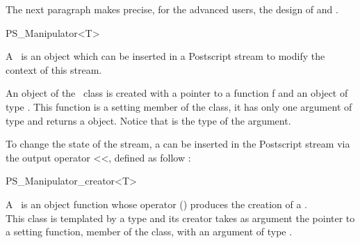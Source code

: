 \begin{ccAdvanced}

The next paragraph makes precise, for the advanced users, the design of
 and .


\begin{ccClassTemplate}{PS_Manipulator<T>}

A \ccClassTemplateName\ is an object which can be inserted in a
Postscript stream to modify the context of this stream.

An object of the \ccClassTemplateName\ class is created with a pointer
to a function f and an object of type . This 
function is a setting member of the  class, it has only one
argument of type  and returns a  object. Notice
that  is the type of the  argument.

\ccCreation
{}


\end{ccClassTemplate}

To change the state of the stream, a  can be
inserted in the Postscript stream via the output operator <<, defined as follow :


 

\begin{ccClassTemplate}{PS_Manipulator_creator<T>}

A \ccClassTemplateName\ is an object function whose operator ()
produces the creation of a .\\
This class is templated by a type  and its creator takes as
argument the pointer to a setting function, member of the
 class, with an argument of type .

\ccCreation
{}

\ccThreeToTwo






\end{ccClassTemplate}
\end{ccAdvanced}
